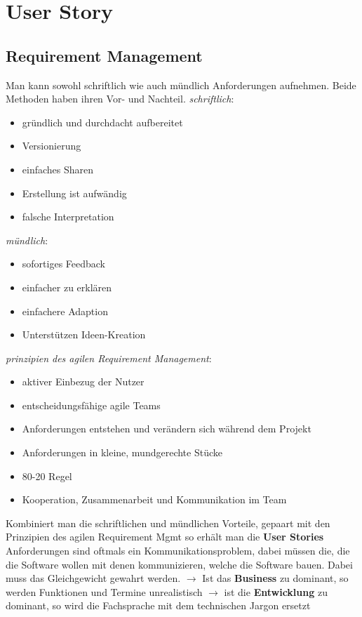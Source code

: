 \documentclass{report}
\theoremstyle{definition}
\theoremstyle{example}
\begin{document}
\chapter{User Story}

\section{Requirement Management}
Man kann sowohl schriftlich wie auch mündlich Anforderungen aufnehmen. Beide Methoden haben ihren Vor- und Nachteil.
\textit{schriftlich}:
\begin{itemize}
	\item gründlich und durchdacht aufbereitet
	\item Versionierung
	\item einfaches Sharen
	\item Erstellung ist aufwändig
	\item falsche Interpretation
\end{itemize}

\textit{mündlich}:
\begin{itemize}
	\item sofortiges Feedback
	\item einfacher zu erklären
	\item einfachere Adaption
	\item Unterstützen Ideen-Kreation
\end{itemize}

\textit{prinzipien des agilen Requirement Management}:
\begin{itemize}
	\item aktiver Einbezug der Nutzer
	\item entscheidungsfähige agile Teams
	\item Anforderungen entstehen und verändern sich während dem Projekt
	\item Anforderungen in kleine, mundgerechte Stücke
	\item 80-20 Regel
	\item Kooperation, Zusammenarbeit und Kommunikation im Team
\end{itemize}

Kombiniert man die schriftlichen und mündlichen Vorteile, gepaart mit den Prinzipien des agilen Requirement Mgmt so erhält man die \textbf{User Stories}\\

Anforderungen sind oftmals ein Kommunikationsproblem, dabei müssen die, die die Software wollen mit denen kommunizieren, welche die Software bauen. Dabei muss das Gleichgewicht gewahrt werden.
$\rightarrow$ Ist das \textbf{Business} zu dominant, so werden Funktionen und Termine unrealistisch
$\rightarrow$ ist die \textbf{Entwicklung} zu dominant, so wird die Fachsprache mit dem technischen Jargon ersetzt
\end{document}
